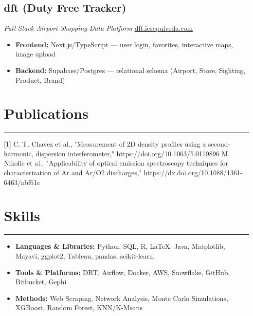 \documentclass[11pt,a4paper]{article}
\newenvironment{myitemize}
{ \begin{itemize}[label={--}, leftmargin=*]
		\setlength{\itemsep}{0pt}
		\setlength{\parskip}{0pt}
		\setlength{\parsep}{0pt}     }
	{ \end{itemize}                  }
\begin{document}
	\subsection*{dft (Duty Free Tracker) \hfill {}}
	\vspace{-1.5mm}
	\textit{Full-Stack Airport Shopping Data Platform} \hfill \href{https://dft.iesepulveda.com}{dft.iesepulveda.com}
	\vspace{-2.5mm}
	\begin{myitemize}
\item \textbf{Frontend:} Next.js/TypeScript --- user login, favorites, interactive maps, image upload
\item \textbf{Backend:} Supabase/Postgres --- relational schema (Airport, Store, Sighting, Product, Brand)
	\end{myitemize}
		\vspace{-6mm} %



	\section*{Publications}
	\vspace{-3mm} %
	
	\hrule
	\vspace{2mm} %
	
	[1] C. T. Chavez et al., "Measurement of 2D density profiles using a second-harmonic, dispersion interferometer," https://doi.org/10.1063/5.0119896 \newline
	[2] M. Nikolic et al., "Applicability of optical emission spectroscopy techniques for characterization of Ar and Ar/O2 discharges," https://dx.doi.org/10.1088/1361-6463/abf61c
%	
	

		\vspace{-4mm} %
	\section*{Skills}
	\vspace{-3mm} %
	\hrule
	\vspace{2mm} %
\begin{myitemize}
	\item \textbf{Languages \& Libraries:} Python, SQL, R, LaTeX, Java, Matplotlib, Mayavi, ggplot2, Tableau, pandas, scikit-learn, 
	\item \textbf{Tools \& Platforms:} DBT, Airflow, Docker, AWS, Snowflake, GitHub, Bitbucket, Gephi
	\item \textbf{Methods:} Web Scraping, Network Analysis, Monte Carlo Simulations, XGBoost, Random Forest, KNN/K-Means
\end{myitemize}
	
	
\end{document}

